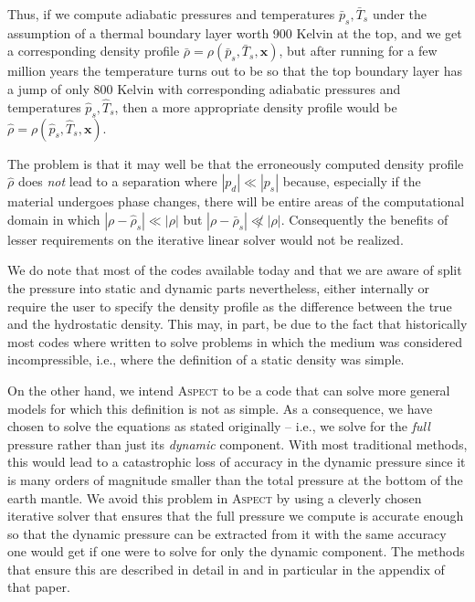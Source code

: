 \documentclass{article}
\newcommand{\aspect}{\textsc{Aspect}}
\begin{document}
\begin{itemize}
  Thus, if we compute adiabatic pressures and
  temperatures $\bar p_s,\bar T_s$ under the assumption of a thermal boundary layer
  worth 900 Kelvin at the top, and we get a corresponding density profile
  $\bar\rho=\rho(\bar p_s,\bar T_s, \mathbf x)$, but after running for a few
  million years the temperature turns out to be so that the top boundary layer
  has a jump of only 800 Kelvin with corresponding adiabatic pressures and
  temperatures $\hat p_s,\hat T_s$, then a more appropriate density profile
  would be $\hat\rho=\rho(\hat p_s,\hat T_s, \mathbf x)$.

  The problem is that it may well be that the erroneously computed density
  profile $\hat \rho$ does \textit{not} lead to a separation where
  $|p_d|\ll|p_s|$ because, especially if the material undergoes phase changes,
  there will be entire areas of the computational domain in which $|\rho-\hat
  \rho_s|\ll |\rho|$ but $|\rho-\bar
  \rho_s|\not\ll |\rho|$. Consequently the benefits of lesser requirements on the
  iterative linear solver would not be realized.
\end{itemize}

We do note that most of the codes available today and that we are aware of
split the pressure into static and dynamic parts nevertheless, either
internally or require the user to specify the density profile as the
difference between the true and the hydrostatic density. This may, in part, be
due to the fact that historically most codes where written to solve problems
in which the medium was considered incompressible, i.e., where the definition
of a static density was simple.

On the other hand, we intend \aspect{} to be a code that can solve more
general models for which this definition is not as simple. As a consequence, we
have chosen to solve the equations as stated originally -- i.e., we solve for
the \textit{full} pressure rather than just its \textit{dynamic} component. With
most traditional methods, this would lead to a catastrophic loss of accuracy in the
dynamic pressure since it is many orders of magnitude smaller than the total
pressure at the bottom of the earth mantle. We avoid this problem in \aspect{}
by using a cleverly chosen iterative solver that ensures that the full pressure
we compute is accurate enough so that the dynamic pressure can be extracted from
it with the same accuracy one would get if one were to solve for only the 
dynamic component. The methods that ensure this are described in detail in
\cite{KHB12} and in particular in the appendix of that paper.
\end{document}
